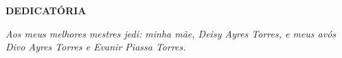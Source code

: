 
\begin{center}
\fontsize{14}{14}
\textbf{DEDICATÓRIA}
\end{center}

\vspace{10cm}

\begin{flushright}
\begin{minipage}[10cm] {8.5cm}
\emph {Aos meus melhores mestres jedi: minha mãe, Deisy Ayres Torres, e meus avós Divo Ayres Torres e Evanir Piassa Torres. }
\end{minipage}
\end{flushright}
